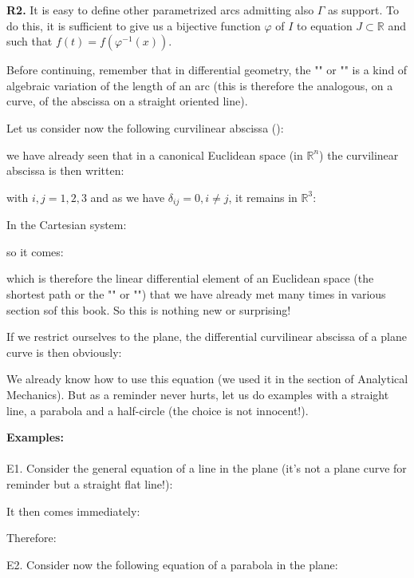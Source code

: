 {\begin{tcolorbox}[title=Remarks,colframe=black,arc=10pt]
	\textbf{R2.} It is easy to define other parametrized arcs admitting also $\Gamma$ as support. To do this, it is sufficient to give us a bijective function $\varphi$ of $I$ to equation $J\subset \mathbb{R}$ and such that $f(t)=f(\varphi^{-1}(x))$.
	\end{tcolorbox}
	Before continuing, remember that in differential geometry, the "" or "" is a kind of algebraic variation of the length of an arc (this is therefore the analogous, on a curve, of the abscissa on a straight oriented line).
	
	Let us consider now the following curvilinear abscissa ():
	
	we have already seen that in a canonical Euclidean space (in $\mathbb{R}^n$) the curvilinear abscissa is then written:
	
	with $i,j=1,2,3$ and as we have $\delta_{ij}=0,i\neq j$, it remains in $\mathbb{R}^3$:
	
	In the Cartesian system:
	
	so it comes:
	
	which is therefore the linear differential element of an Euclidean space (the shortest path or the "" or "") that we have already met many times in various section sof this book. So this is nothing new or surprising!
	
	If we restrict ourselves to the plane, the differential curvilinear abscissa of a plane curve is then obviously:
	
	We already know how to use this equation (we used it in the section of Analytical Mechanics). But as a reminder never hurts, let us do examples with a straight line, a parabola and a half-circle (the choice is not innocent!).
	\begin{tcolorbox}[colframe=black,colback=white,sharp corners]
	\textbf{{\Large {}}Examples:}\\\\
	E1. Consider the general equation of a line in the plane (it's not a plane curve for reminder but a straight flat line!):
	
	It then comes immediately:
	
	Therefore:
	
	E2. Consider now the following equation of a parabola in the plane:
	

\end{tcolorbox}}
